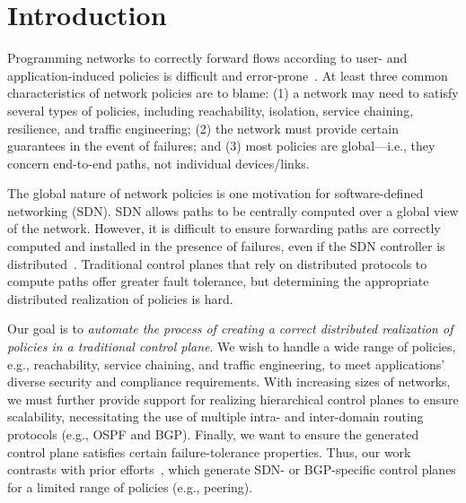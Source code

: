 \section{Introduction}
Programming networks to correctly forward flows according to user- and
application-induced policies is difficult and
error-prone~\cite{troubleshooting, bgpmisconfig}. At least three
common characteristics of network policies are to blame: (1) a network
may need to satisfy several types of policies, including reachability,
isolation, service chaining, resilience, and traffic engineering; (2)
the network must provide certain guarantees in the event of failures;
and (3) most policies are global---i.e., they concern end-to-end
paths, not individual devices/links.


The global nature of network policies is one motivation for
software-defined networking (SDN). SDN allows paths to be centrally
computed over a global view of the network. However, it is difficult
to ensure forwarding paths are correctly computed and installed in the
presence of failures, even if the SDN controller is
distributed~\cite{hasdn}.  Traditional control planes that rely on
distributed protocols to compute paths offer greater fault tolerance,
but determining the appropriate distributed realization of policies is
hard.




Our goal is to {\em automate the process of creating a correct
  distributed realization of policies in a traditional control
  plane}. We wish to handle a wide range of policies, e.g.,
reachability, service chaining, and traffic engineering, to meet
applications' diverse security and compliance requirements. With
increasing sizes of networks, we must further provide support for
realizing hierarchical control planes to ensure scalability,
necessitating the use of multiple intra- and inter-domain routing
protocols (e.g., OSPF and BGP). Finally, we want to ensure the
generated control plane satisfies certain failure-tolerance
properties. Thus, our work contrasts with prior efforts~\cite{netegg,
  propane, merlin,simple,fattire, netkat, netkatcompiler, sol}, which
generate SDN- or BGP-specific control planes for a limited range of
policies (e.g., peering).

